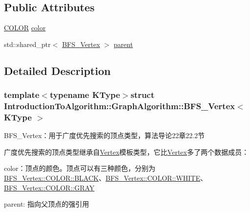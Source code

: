 \subsection*{Public Attributes}
\begin{DoxyCompactItemize}
\item 
\hyperlink{struct_introduction_to_algorithm_1_1_graph_algorithm_1_1_b_f_s___vertex_a3f00f12565def71750f1f163e0e52305}{C\+O\+L\+O\+R} \hyperlink{struct_introduction_to_algorithm_1_1_graph_algorithm_1_1_b_f_s___vertex_a7ab527ab8514bcb65e56edbe62b28fbb}{color}
\item 
std\+::shared\+\_\+ptr$<$ \hyperlink{struct_introduction_to_algorithm_1_1_graph_algorithm_1_1_b_f_s___vertex}{B\+F\+S\+\_\+\+Vertex} $>$ \hyperlink{struct_introduction_to_algorithm_1_1_graph_algorithm_1_1_b_f_s___vertex_a11202710469656d7fb04635430355c41}{parent}
\end{DoxyCompactItemize}


\subsection{Detailed Description}
\subsubsection*{template$<$typename K\+Type$>$struct Introduction\+To\+Algorithm\+::\+Graph\+Algorithm\+::\+B\+F\+S\+\_\+\+Vertex$<$ K\+Type $>$}

B\+F\+S\+\_\+\+Vertex：用于广度优先搜索的顶点类型，算法导论22章22.2节 

广度优先搜索的顶点类型继承自{\ttfamily \hyperlink{struct_introduction_to_algorithm_1_1_graph_algorithm_1_1_vertex}{Vertex}}模板类型，它比{\ttfamily \hyperlink{struct_introduction_to_algorithm_1_1_graph_algorithm_1_1_vertex}{Vertex}}多了两个数据成员：


\begin{DoxyItemize}
\item {\ttfamily color}：顶点的颜色。顶点可以有三种颜色，分别为{\ttfamily \hyperlink{struct_introduction_to_algorithm_1_1_graph_algorithm_1_1_b_f_s___vertex_a3f00f12565def71750f1f163e0e52305a08d0012388564e95c3b4a7407cf04965}{B\+F\+S\+\_\+\+Vertex\+::\+C\+O\+L\+O\+R\+::\+B\+L\+A\+C\+K}}、{\ttfamily \hyperlink{struct_introduction_to_algorithm_1_1_graph_algorithm_1_1_b_f_s___vertex_a3f00f12565def71750f1f163e0e52305ab5bf627e448384cf3a4c35121ca6008d}{B\+F\+S\+\_\+\+Vertex\+::\+C\+O\+L\+O\+R\+::\+W\+H\+I\+T\+E}}、{\ttfamily \hyperlink{struct_introduction_to_algorithm_1_1_graph_algorithm_1_1_b_f_s___vertex_a3f00f12565def71750f1f163e0e52305a48bf014c704c9eaae100a98006a37bf7}{B\+F\+S\+\_\+\+Vertex\+::\+C\+O\+L\+O\+R\+::\+G\+R\+A\+Y}}
\item {\ttfamily parent}\+: 指向父顶点的强引用
\end{DoxyItemize}

